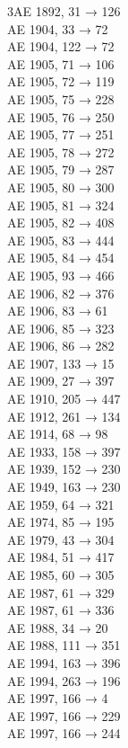 \begin{multicols}{3}\footnotesize\noindent AE 1892, 31 → 126\\
AE 1904, 33 → 72\\
AE 1904, 122 → 72\\
AE 1905, 71 → 106\\
AE 1905, 72 → 119\\
AE 1905, 75 → 228\\
AE 1905, 76 → 250\\
AE 1905, 77 → 251\\
AE 1905, 78 → 272\\
AE 1905, 79 → 287\\
AE 1905, 80 → 300\\
AE 1905, 81 → 324\\
AE 1905, 82 → 408\\
AE 1905, 83 → 444\\
AE 1905, 84 → 454\\
AE 1905, 93 → 466\\
AE 1906, 82 → 376\\
AE 1906, 83 → 61\\
AE 1906, 85 → 323\\
AE 1906, 86 → 282\\
AE 1907, 133 → 15\\
AE 1909, 27 → 397\\
AE 1910, 205 → 447\\
AE 1912, 261 → 134\\
AE 1914, 68 → 98\\
AE 1933, 158 → 397\\
AE 1939, 152 → 230\\
AE 1949, 163 → 230\\
AE 1959, 64 → 321\\
AE 1974, 85 → 195\\
AE 1979, 43 → 304\\
AE 1984, 51 → 417\\
AE 1985, 60 → 305\\
AE 1987, 61 → 329\\
AE 1987, 61 → 336\\
AE 1988, 34 → 20\\
AE 1988, 111 → 351\\
AE 1994, 163 → 396\\
AE 1994, 263 → 196\\
AE 1997, 166 → 4\\
AE 1997, 166 → 229\\
AE 1997, 166 → 244\\

\end{multicols}
